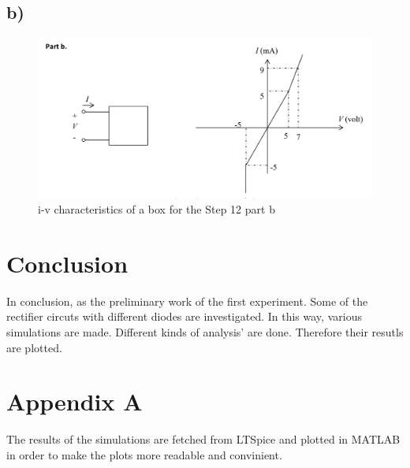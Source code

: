 \documentclass[letterpaper,12pt]{article}
\begin{document}
\subsection{b)}
\begin{figure}[H]
    \centering
   \includegraphics[width=1\textwidth]{12_2.png}
   \caption{i-v characteristics of a box for the Step 12 part b}
\end{figure} 
\fi
\section{Conclusion}
In conclusion, as the preliminary work of the first experiment. Some of the rectifier circuts with different diodes are investigated. In this way, various simulations are made. Different kinds of analysis' are done. Therefore their resutls are plotted.
\section*{Appendix A}
The results of the simulations are fetched from LTSpice and plotted in MATLAB in order to make the plots more readable and convinient.
\end{document}
